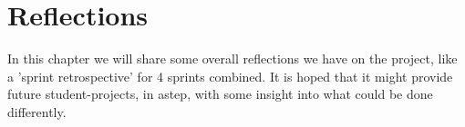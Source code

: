 \chapter{Reflections}
In this chapter we will share some overall reflections we have on the project, like a 'sprint retrospective' for 4 sprints combined. It is hoped that it might provide future student-projects, in \gls{astep}, with some insight into what could be done differently.


